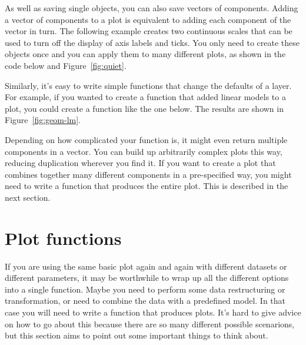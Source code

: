 As well as saving single objects, you can also save vectors of \ggplot components. Adding a vector of components to a plot is equivalent to adding each component of the vector in turn. The following example creates two continuous scales that can be used to turn off the display of axis labels and ticks. You only need to create these objects once and you can apply them to many different plots, as shown in the code below and Figure~\ref{fig:quiet}.

% 
% 


Similarly, it's easy to write simple functions that change the defaults of a layer. For example, if you wanted to create a function that added linear models to a plot, you could create a function like the one below. The results are shown in Figure~\ref{fig:geom-lm}.

% 


Depending on how complicated your function is, it might even return multiple components in a vector. You can build up arbitrarily complex plots this way, reducing duplication wherever you find it.  If you want to create a plot that combines together many different components in a pre-specified way, you might need to write a function that produces the entire plot. This is described in the next section.

\section{Plot functions}
\label{sec:functions}

If you are using the same basic plot again and again with different datasets or different parameters, it may be worthwhile to wrap up all the different options into a single function. Maybe you need to perform some data restructuring or transformation, or need to combine the data with a predefined model. In that case you will need to write a function that produces \ggplot plots. It's hard to give advice on how to go about this because there are so many different possible scenarions, but this section aims to point out some important things to think about.

